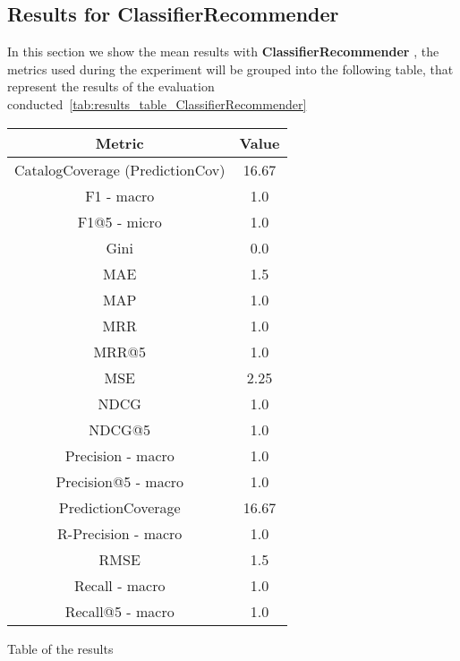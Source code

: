 \documentclass[11pt]{article}
\begin{document}
\subsection{Results for ClassifierRecommender}\label{subsec:ClassifierRecommender}
In this section we show the mean results with \textbf{ ClassifierRecommender }, the metrics used during the experiment will be
grouped into the following table, that represent the results of the evaluation conducted~\ref{tab:results_table_ClassifierRecommender}

\begin{center}
    \begin{tabular}{|c|c|}
        \hline
        \textbf{Metric} & \textbf{Value} \\ \hline
                CatalogCoverage (PredictionCov) & 16.67 \\ \hline
                F1 - macro & 1.0 \\ \hline
                F1@5 - micro & 1.0 \\ \hline
                Gini & 0.0 \\ \hline
                MAE & 1.5 \\ \hline
                MAP & 1.0 \\ \hline
                MRR & 1.0 \\ \hline
                MRR@5 & 1.0 \\ \hline
                MSE & 2.25 \\ \hline
                NDCG & 1.0 \\ \hline
                NDCG@5 & 1.0 \\ \hline
                Precision - macro & 1.0 \\ \hline
                Precision@5 - macro & 1.0 \\ \hline
                PredictionCoverage & 16.67 \\ \hline
                R-Precision - macro & 1.0 \\ \hline
                RMSE & 1.5 \\ \hline
                Recall - macro & 1.0 \\ \hline
                Recall@5 - macro & 1.0 \\ \hline
             \end{tabular}
    \captionsetup{type=table}
    \caption{Table of the results}
    \label{tab:results_table_ClassifierRecommender}
\end{center}
\hfill\break
\hfill\break
\end{document}
